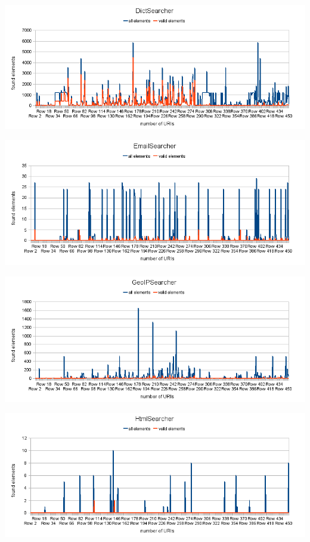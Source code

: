 \documentclass[11pt,a4paper]{article}
\begin{document}
\begin{center}
\includegraphics[width=135mm]{dict.png}	


\includegraphics[width=135mm]{email.png}


\includegraphics[width=135mm]{geo.png}


\includegraphics[width=135mm]{html.png}
\end{center}
\end{document}
